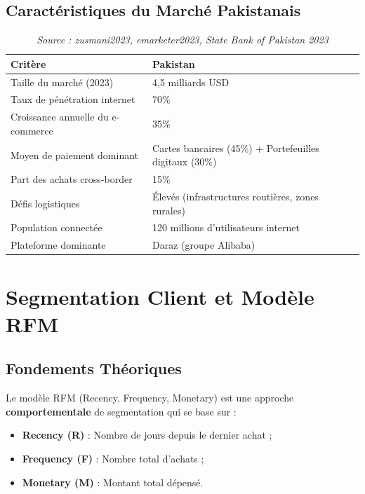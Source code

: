 \documentclass[a4paper,12pt]{article}
\begin{document}
\subsection{Caractéristiques du Marché Pakistanais}
\begin{table}[H]
\centering
\begin{tabular}{|l|l|}
\hline
\textbf{Critère} & \textbf{Pakistan} \\
\hline
Taille du marché (2023) & 4,5 milliards USD \\
\hline
Taux de pénétration internet & 70\% \\
\hline
Croissance annuelle du e-commerce & 35\% \\
\hline
Moyen de paiement dominant & Cartes bancaires (45\%) + Portefeuilles digitaux (30\%) \\
\hline
Part des achats cross-border & 15\% \\
\hline
Défis logistiques & Élevés (infrastructures routières, zones rurales) \\
\hline
Population connectée & 120 millions d'utilisateurs internet \\
\hline
Plateforme dominante & Daraz (groupe Alibaba) \\
\hline
\end{tabular}
\caption{Caractéristiques du marché e-commerce pakistanais}
\caption*{\textit{Source : zusmani2023, emarketer2023, State Bank of Pakistan 2023}}
\label{tab:marche_pakistanais}

\end{table}
\section{Segmentation Client et Modèle RFM}

\subsection{Fondements Théoriques}
Le modèle RFM (Recency, Frequency, Monetary) est une approche \textbf{comportementale} de segmentation qui se base sur :
\begin{itemize}
    \item \textbf{Recency (R)} : Nombre de jours depuis le dernier achat ;
    \item \textbf{Frequency (F)} : Nombre total d'achats ;
    \item \textbf{Monetary (M)} : Montant total dépensé.
\end{itemize}
\end{document}
